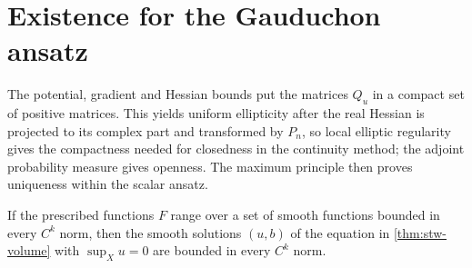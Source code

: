 \section{Existence for the Gauduchon ansatz}
\label{sec:stw-continuity}

The potential, gradient and Hessian bounds put the matrices $Q_u$ in a compact set of positive matrices. This yields uniform ellipticity after the real Hessian is projected to its complex part and transformed by $P_n$, so local elliptic regularity gives the compactness needed for closedness in the continuity method; the adjoint probability measure gives openness. The maximum principle then proves uniqueness within the scalar ansatz.

\begin{lemma}\label{lem:stw-higher-regularity}
If the prescribed functions $F$ range over a set of smooth functions bounded in every $C^k$ norm, then the smooth solutions $(u,b)$ of the equation in \cref{thm:stw-volume} with $\sup_Xu=0$ are bounded in every $C^k$ norm.
\end{lemma}
